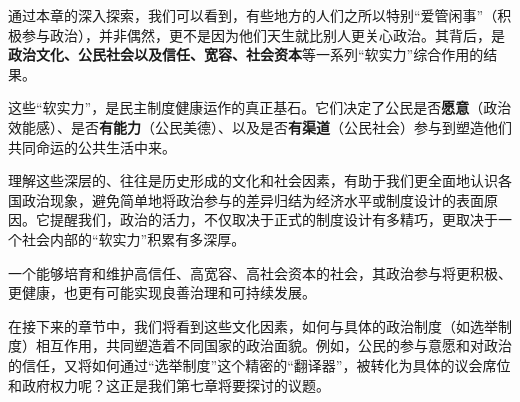 通过本章的深入探索，我们可以看到，有些地方的人们之所以特别“爱管闲事”（积极参与政治），并非偶然，更不是因为他们天生就比别人更关心政治。其背后，是\textbf{政治文化、公民社会以及信任、宽容、社会资本}等一系列“软实力”综合作用的结果。

这些“软实力”，是民主制度健康运作的真正基石。它们决定了公民是否\textbf{愿意}（政治效能感）、是否\textbf{有能力}（公民美德）、以及是否\textbf{有渠道}（公民社会）参与到塑造他们共同命运的公共生活中来。

理解这些深层的、往往是历史形成的文化和社会因素，有助于我们更全面地认识各国政治现象，避免简单地将政治参与的差异归结为经济水平或制度设计的表面原因。它提醒我们，政治的活力，不仅取决于正式的制度设计有多精巧，更取决于一个社会内部的“软实力”积累有多深厚。

一个能够培育和维护高信任、高宽容、高社会资本的社会，其政治参与将更积极、更健康，也更有可能实现良善治理和可持续发展。

在接下来的章节中，我们将看到这些文化因素，如何与具体的政治制度（如选举制度）相互作用，共同塑造着不同国家的政治面貌。例如，公民的参与意愿和对政治的信任，又将如何通过“选举制度”这个精密的“翻译器”，被转化为具体的议会席位和政府权力呢？这正是我们第七章将要探讨的议题。
